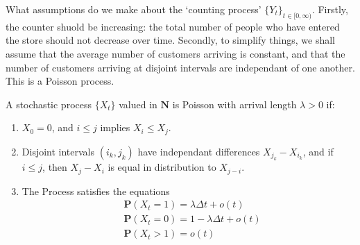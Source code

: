 What assumptions do we make about the `counting process' $\{ Y_t \}_{t \in [0,\infty)}$. Firstly, the counter shuold be increasing: the total number of people who have entered the store should not decrease over time. Secondly, to simplify things, we shall assume that the average number of customers arriving is constant, and that the number of customers arriving at disjoint intervals are independant of one another. This is a Poisson process.

\begin{definition}
    A stochastic process $\{ X_t \}$ valued in $\mathbf{N}$ is Poisson with arrival length $\lambda > 0$ if:
    \begin{enumerate}
        \item $X_0 = 0$, and $i \leq j$ implies $X_i \leq X_j$.
        \item Disjoint intervals $(i_k, j_k)$ have independant differences $X_{j_k} - X_{i_k}$, and if $i \leq j$, then $X_j - X_i$ is equal in distribution to $X_{j-i}$.
        \item The Process satisfies the equations
        \begin{align}
            &\label{posson1} \mathbf{P}(X_t = 1) = \lambda \Delta t + o(t)\\
            &\label{poisson2} \mathbf{P}(X_t = 0) = 1 - \lambda \Delta t + o(t)\\
            &\label{poisson3} \mathbf{P}(X_t > 1) = o(t)
        \end{align}
    \end{enumerate}
\end{definition}

